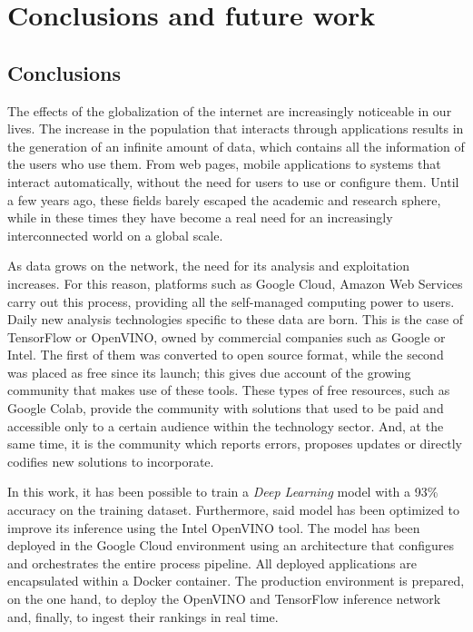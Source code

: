 \mbox{}

\chapter{Conclusions and future work}
\label{ch: chapte6}

\section{Conclusions}\label{sec: conclusions}
The effects of the globalization of the internet are increasingly noticeable in our lives.
The increase in the population that interacts through applications results in the generation of an infinite amount of data, which contains all the information of the users who use them. From web pages, mobile applications to systems that interact automatically, without the need for users to use or configure them. Until a few years ago, these fields barely escaped the academic and research sphere, while in these times they have become a real need for an increasingly interconnected world on a global scale.


As data grows on the network, the need for its analysis and exploitation increases.
For this reason, platforms such as Google Cloud, Amazon Web Services carry out this process, providing all the self-managed computing power to users.
Daily new analysis technologies specific to these data are born.
This is the case of TensorFlow or OpenVINO, owned by commercial companies such as Google or Intel.
The first of them was converted to open source format, while the second was placed as free since its launch; this gives due account of the growing community that makes use of these tools.
These types of free resources, such as Google Colab, provide the community with solutions that used to be paid and accessible only to a certain audience within the technology sector.
And, at the same time, it is the community which reports errors, proposes updates or directly codifies new solutions to incorporate.

In this work, it has been possible to train a \textit{Deep Learning} model with a 93\% accuracy on the training dataset.
Furthermore, said model has been optimized to improve its inference using the Intel OpenVINO tool.
The model has been deployed in the Google Cloud environment using an architecture that configures and orchestrates the entire process pipeline. All deployed applications are encapsulated within a Docker container.
The production environment is prepared, on the one hand, to deploy the OpenVINO and TensorFlow inference network and, finally, to ingest their rankings in real time.

